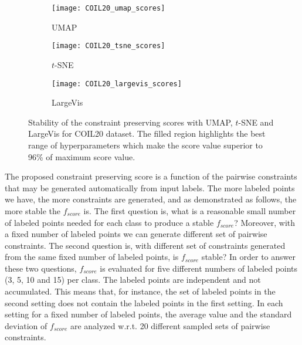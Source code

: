 \begin{figure}[ht!]
\begin{subfigure}[b]{0.32\linewidth}
     \centering
     \texttt{[image: COIL20\_umap\_scores]}
     \caption{UMAP}
\end{subfigure}
\hfill
\begin{subfigure}[b]{0.32\linewidth}
     \centering
     \texttt{[image: COIL20\_tsne\_scores]}
     \caption{$t$-SNE}
\end{subfigure}
\hfill
\begin{subfigure}[b]{0.32\linewidth}
     \centering
     \texttt{[image: COIL20\_largevis\_scores]}
     \caption{LargeVis}
\end{subfigure}
\caption{Stability of the constraint preserving scores with UMAP, $t$-SNE and LargeVis for COIL20 dataset.
The filled region highlights the best range of hyperparameters which make the score value superior to 96\% of maximum score value.}
\label{fig:score:stability:COIL20}
\end{figure}

The proposed constraint preserving score is a function of the pairwise constraints that may be generated automatically from input labels.
The more labeled points we have, the more constraints are generated, and as demonstrated as follows, the more stable the $f_{score}$ is.
The first question is, what is a reasonable small number of labeled points needed for each class to produce a stable $f_{score}$?
Moreover, with a fixed number of labeled points we can generate different set of pairwise constraints.
The second question is, with different set of constraints generated from the same fixed number of labeled points, is $f_{score}$ stable?
In order to answer these two questions, $f_{score}$ is evaluated for five different numbers of labeled points (3, 5, 10 and 15) per class.
The labeled points are independent and not accumulated.
This means that, for instance, the set of labeled points in the second setting does not contain the labeled points in the first setting.
In each setting for a fixed number of labeled points, the average value and the standard deviation of $f_{score}$ are analyzed w.r.t. 20 different sampled sets of pairwise constraints.

